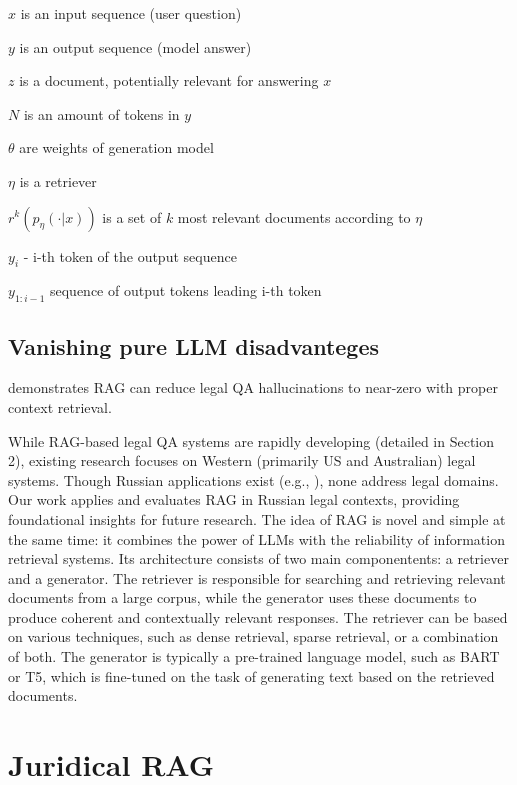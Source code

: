 \space \space $x$ is an input sequence (user question)

\space \space $y$ is an output sequence (model answer)

\space \space $z$ is a document, potentially relevant for answering $x$

\space \space $N$ is an amount of tokens in $y$

\space \space $\theta$ are weights of generation model

\space \space $\eta$ is a retriever

\space \space $r^k(p_\eta(\cdot | x))$ is a set of $k$ most relevant documents according to $\eta$

\space \space $y_i$ - i-th token of the output sequence

\space \space $y_{1:i - 1}$ sequence of output tokens leading i-th token




\subsection{Vanishing pure LLM disadvanteges}
 \cite{mageshHallucinationFreeAssessingReliability2024a} demonstrates RAG can reduce legal QA hallucinations to near-zero with proper context retrieval.

While RAG-based legal QA systems are rapidly developing (detailed in Section 2), existing research focuses on Western (primarily US and Australian) legal systems. Though Russian applications exist (e.g., \cite{kolaScienceCenter}), none address legal domains. Our work applies and evaluates RAG in Russian legal contexts, providing foundational insights for future research.
The idea of RAG is novel and simple at the same time: it combines the power of LLMs with the reliability of information retrieval systems.
Its architecture consists of two main componentents: a retriever and a generator.
The retriever is responsible for searching and retrieving relevant documents from a large corpus, while the generator uses these documents to produce coherent and contextually relevant responses.
The retriever can be based on various techniques, such as dense retrieval, sparse retrieval, or a combination of both.
The generator is typically a pre-trained language model, such as BART or T5, which is fine-tuned on the task of generating text based on the retrieved documents.

    




\section{Juridical RAG}